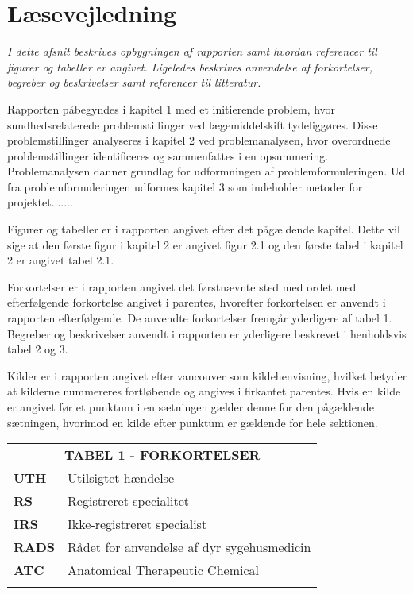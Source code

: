 \section*{Læsevejledning}
\textit{I dette afsnit beskrives opbygningen af rapporten samt hvordan referencer til figurer og tabeller er angivet. Ligeledes beskrives anvendelse af forkortelser, begreber og beskrivelser samt referencer til litteratur.}

Rapporten påbegyndes i kapitel 1 med et initierende problem, hvor sundhedsrelaterede problemstillinger ved lægemiddelskift tydeliggøres. Disse problemstillinger analyseres i kapitel 2 ved problemanalysen, hvor overordnede problemstillinger identificeres og sammenfattes i en opsummering. Problemanalysen danner grundlag for udformningen af problemformuleringen. Ud fra problemformuleringen udformes kapitel 3 som indeholder metoder for projektet.......

Figurer og tabeller er i rapporten angivet efter det pågældende kapitel. Dette vil sige at den første figur i kapitel 2 er angivet figur 2.1 og den første tabel i kapitel 2 er angivet tabel 2.1.

Forkortelser er i rapporten angivet det førstnævnte sted med ordet med efterfølgende forkortelse angivet i parentes, hvorefter forkortelsen er anvendt i rapporten efterfølgende. De anvendte forkortelser fremgår yderligere af tabel 1. Begreber og beskrivelser  anvendt i rapporten er yderligere beskrevet i henholdsvis tabel 2 og 3.

Kilder er i rapporten angivet efter vancouver som kildehenvisning, hvilket betyder at kilderne nummereres fortløbende og angives i firkantet parentes. Hvis en kilde er angivet før et punktum i en sætningen gælder denne for den pågældende sætningen, hvorimod en kilde efter punktum er gældende for hele sektionen.


\begin{table}[H]
\label{table:forkortelser}
\begin{tabular}{p{1.5cm} p{12.8cm}}
\multicolumn{2}{c}{\cellcolor[HTML]{C0C0C0}\textbf{TABEL 1 - FORKORTELSER}} \vspace{0.5cm} \\
\textbf{UTH} 
& Utilsigtet hændelse \vspace{0.5cm} \\
\textbf{RS} & Registreret specialitet \vspace{0.5cm} \\
\textbf{IRS} & Ikke-registreret specialist  \vspace{0.5cm} \\
\textbf{RADS} & Rådet for anvendelse af dyr sygehusmedicin \vspace{0.5cm} \\
\textbf{ATC} & Anatomical Therapeutic Chemical \vspace{0.5cm} \\
  & \vspace{0.5cm} \\
\end{tabular}
\end{table}

